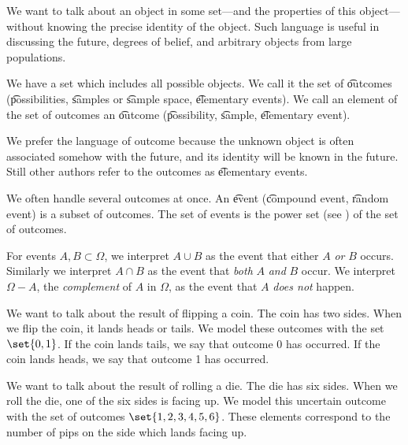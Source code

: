 

We want to talk about an object in some set---and the properties of this object---without knowing the precise identity of the object.
Such language is useful in discussing the future, degrees of belief, and arbitrary objects from large populations.


We have a set which includes all possible objects.
We call it the set of \t{outcomes} (\t{possibilities}, \t{samples} or \t{sample space}, \t{elementary events}).
We call an element of the set of outcomes an \t{outcome} (\t{possibility}, \t{sample}, \t{elementary event}).

We prefer the language of outcome because the unknown object is often associated somehow with the future, and its identity will be known in the future.
Still other authors refer to the outcomes as \t{elementary events}.

We often handle several outcomes at once.
An \t{event} (\t{compound event}, \t{random event}) is a subset of outcomes.
The set of events is the power set (see ) of the set of outcomes.

For events $A, B \subset \Omega $, we interpret $A \cup B$ as the event that either $A$ \textit{or} $B$ occurs.
Similarly we interpret $A \cap B$ as the event that \textit{both} $A$ \textit{and} $B$ occur.
We interpret $\Omega  - A$, the \textit{complement} of $A$ in $\Omega $, as the event that $A$ \textit{does not} happen.


We want to talk about the result of flipping a coin.
The coin has two sides.
When we flip the coin, it lands heads or tails.
We model these outcomes with the set $\set{0, 1}$.
If the coin lands tails, we say that outcome 0 has occurred.
If the coin lands heads, we say that outcome 1 has occurred.


We want to talk about the result of rolling a die.
The die has six sides.
When we roll the die, one of the six sides is facing up.
We model this uncertain outcome with the set of outcomes $\set{1, 2, 3, 4, 5, 6}$.
These elements correspond to the number of pips on the side which lands facing up.

